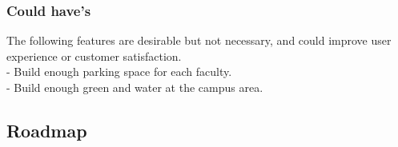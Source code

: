 \subsubsection{Could have's}
The following features are desirable but not necessary, and could improve user experience or customer satisfaction.\\
\indent- 	Build enough parking space for each faculty.\\
\indent-    	Build enough green and water at the campus area.\\




\subsection{Roadmap}